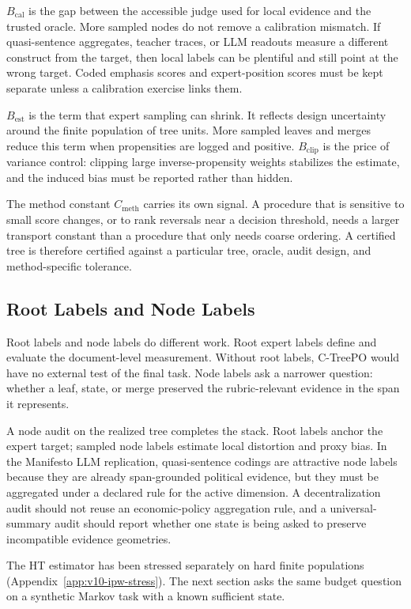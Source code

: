 \(B_{\mathrm{cal}}\) is the gap between the accessible judge used
for local evidence and the trusted oracle. More sampled nodes do
not remove a calibration mismatch. If quasi-sentence aggregates,
teacher traces, or LLM readouts measure a different construct from
the target, then local labels can be plentiful and still point at
the wrong target. Coded emphasis scores and expert-position scores
must be kept separate unless a calibration exercise links them.

\(B_{\mathrm{est}}\) is the term that expert sampling can shrink.
It reflects design uncertainty around the finite population of tree
units. More sampled leaves and merges reduce this term when
propensities are logged and positive. \(B_{\mathrm{clip}}\) is the
price of variance control: clipping large inverse-propensity
weights stabilizes the estimate, and the induced bias must be
reported rather than hidden.

The method constant \(C_{\mathrm{meth}}\) carries its own signal. A
procedure that is sensitive to small score changes, or to rank
reversals near a decision threshold, needs a larger transport
constant than a procedure that only needs coarse ordering. A
certified tree is therefore certified against a particular tree,
oracle, audit design, and method-specific tolerance.

\subsection{Root Labels and Node Labels}

Root labels and node labels do different work. Root expert labels
define and evaluate the document-level measurement. Without root
labels, C-TreePO would have no external test of the final task.
Node labels ask a narrower question: whether a leaf, state, or
merge preserved the rubric-relevant evidence in the span it
represents.

A node audit on the realized tree completes the stack. Root labels
anchor the expert target; sampled node labels estimate local
distortion and proxy bias. In the Manifesto LLM replication,
quasi-sentence codings are attractive node labels because they are
already span-grounded political evidence, but they must be
aggregated under a declared rule for the active dimension. A
decentralization audit should not reuse an economic-policy
aggregation rule, and a universal-summary audit should report
whether one state is being asked to preserve incompatible evidence
geometries.

The HT estimator has been stressed separately on hard finite
populations (Appendix~\ref{app:v10-ipw-stress}). The next section
asks the same budget question on a synthetic Markov task with a
known sufficient state.
